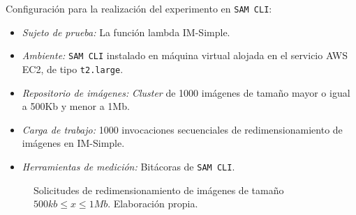 Configuración para la realización del experimento en \texttt{SAM CLI}:
\begin{itemize}
    \item \emph{Sujeto de prueba:} La función lambda IM-Simple.
    \item \emph{Ambiente:} \texttt{SAM CLI} instalado en máquina virtual alojada en el servicio AWS EC2, de tipo \texttt{t2.large}.
    \item \emph{Repositorio de imágenes:} \emph{Cluster} de 1000 imágenes de tamaño mayor o igual a 500Kb y menor a 1Mb.
    \item \emph{Carga de trabajo:} 1000 invocaciones secuenciales de redimensionamiento de imágenes en IM-Simple.
    \item \emph{Herramientas de medición:} Bitácoras de \texttt{SAM CLI}.
\end{itemize}

\begin{figure}
\hspace{-1cm}
\caption[\hspace{0.2cm} Solicitudes de redimensionamiento de imágenes de tamaño $500kb \leq x \leq 1Mb$]{Solicitudes de redimensionamiento de imágenes de tamaño $500kb \leq x \leq 1Mb$. Elaboración propia.}
\label{fig:comparacion-sam-1mb}
\end{figure}

